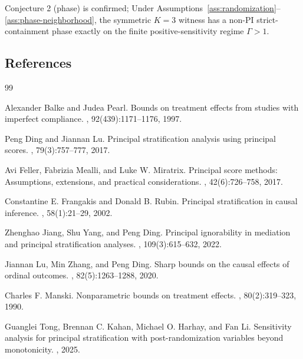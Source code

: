 \documentclass[11pt]{article}
\theoremstyle{definition}
\theoremstyle{plain}
\theoremstyle{remark}
\begin{document}
Conjecture 2 (phase) is confirmed; Under Assumptions~\ref{ass:randomization}--\ref{ass:phase-neighborhood}, the symmetric \(K=3\) witness has a non-PI strict-containment phase exactly on the finite positive-sensitivity regime \(\Gamma>1\).

\subsection*{References}
\begin{thebibliography}{99}

Alexander Balke and Judea Pearl.
\newblock Bounds on treatment effects from studies with imperfect compliance.
, 92(439):1171--1176, 1997.

Peng Ding and Jiannan Lu.
\newblock Principal stratification analysis using principal scores.
, 79(3):757--777, 2017.

Avi Feller, Fabrizia Mealli, and Luke W. Miratrix.
\newblock Principal score methods: Assumptions, extensions, and practical considerations.
, 42(6):726--758, 2017.

Constantine E. Frangakis and Donald B. Rubin.
\newblock Principal stratification in causal inference.
, 58(1):21--29, 2002.

Zhenghao Jiang, Shu Yang, and Peng Ding.
\newblock Principal ignorability in mediation and principal stratification analyses.
, 109(3):615--632, 2022.

Jiannan Lu, Min Zhang, and Peng Ding.
\newblock Sharp bounds on the causal effects of ordinal outcomes.
, 82(5):1263--1288, 2020.

Charles F. Manski.
\newblock Nonparametric bounds on treatment effects.
, 80(2):319--323, 1990.

Guanglei Tong, Brennan C. Kahan, Michael O. Harhay, and Fan Li.
\newblock Sensitivity analysis for principal stratification with post-randomization variables beyond monotonicity.
, 2025.


\end{thebibliography}
\end{document}
